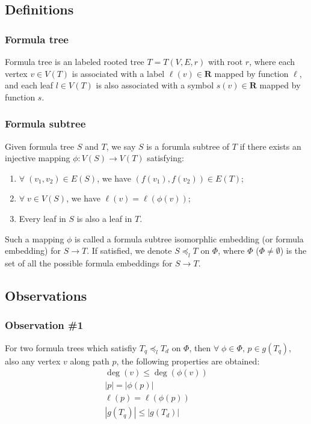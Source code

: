 \subsection{Definitions}

\subsubsection{Formula tree}
Formula tree is an labeled rooted tree $T = T(V,E,r)$ with root $r$, where each vertex $v \in V(T)$ is associated with a label $\ell(v) \in \mathbf{R}$ mapped by function $\ell$, and each leaf $l \in V(T)$ is also associated with a symbol $s(v) \in \mathbf{R}$ mapped by function $s$.

\subsubsection{Formula subtree}
Given formula tree $S$ and $T$, we say $S$ is a forumla subtree of $T$ if there exists an injective mapping $\phi: V(S) \rightarrow V(T)$ satisfying:

\begin{enumerate}
\item 
$\forall\; (v_1,v_2) \in E(S)$, we have $(f(v_1),f(v_2)) \in E(T)$;
\item
$\forall\; v \in V(S)$, we have $\ell(v) = \ell(\phi(v))$;
\item
Every leaf in $S$ is also a leaf in $T$.
\end{enumerate}
Such a mapping $\phi$ is called a formula subtree isomorphlic embedding (or formula embedding) for $S \rightarrow T$. 
If satisfied, we denote $S \preceq_l T$ on $\Phi$, where $\Phi$ ($\Phi \neq \emptyset$) is the set of all the possible formula embeddings for $S \rightarrow T$.

\subsection{Observations}
\subsubsection*{Observation \#1} 
For two formula trees which satisfiy $T_q \preceq_l T_d$ on $\Phi$, then $\forall\; \phi \in \Phi,\, p \in g(T_q)$, also any vertex $v$ along path $p$, the following properties are obtained:
\begin{eqnarray}
\deg(v) \le \deg(\phi(v)) \label{equ1} \\
\left| p \right| = \left| \phi(p) \right| \label{equ2} \\
\ell(p) = \ell(\phi(p)) \label{equ3} \\
\left| g(T_q) \right| \le \left| g(T_d) \right| \label{equ4}
\end{eqnarray}

